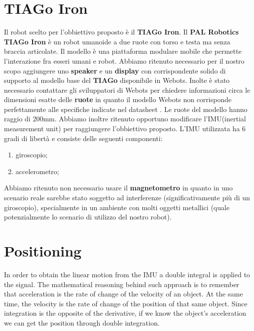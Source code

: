 \documentclass[a4paper]{article}
\begin{document}
	\section{TIAGo Iron} 
	Il robot scelto per l'obbiettivo proposto è il \textbf{TIAGo Iron}. \newline Il \textbf{PAL Robotics TIAGo Iron}\cite{tiagoiron} è un robot umanoide a due ruote con torso e testa ma senza braccia articolate. Il modello è una piattaforma modulare mobile che permette l'interazione fra esseri umani e robot. \newline
	Abbiamo ritenuto necessario per il nostro scopo aggiungere uno \textbf{speaker} e un \textbf{display} con corrispondente solido di supporto al modello base del \textbf{TIAGo} disponibile in Webots.
	Inolte è stato necessario contattare gli sviluppatori di Webots per chiedere informazioni circa le dimensioni esatte delle \textbf{ruote} in quanto il modello Webots non corrisponde perfettamente alle specifiche indicate nel datasheet \cite{Tiago IRON datasheet}. Le ruote del modello hanno raggio di 200mm. \newline
	\newline Abbiamo inoltre ritenuto opportuno modificare l'IMU(inertial measurement unit) per raggiungere l'obbiettivo proposto. L'IMU utilizzata ha 6 gradi di libertà e consiste delle seguenti componenti:
	\begin{enumerate}
		\item giroscopio;	
		\item accelerometro;
	\end{enumerate}
	Abbiamo ritenuto non necessario usare il \textbf{magnetometro} in quanto in uno scenario reale sarebbe stato soggetto ad interferenze (significativamente più di un giroscopio), specialmente in un ambiente con molti oggetti metallici (quale potenzialmente lo scenario di utilizzo del nostro robot).

	\section{Positioning}
	In order to obtain the linear motion from the IMU a double integral is applied to the signal. The mathematical reasoning behind such approach is to remember that acceleration is the rate of change of the velocity of an object. At the same time, the velocity is the rate of change of the position of that same object. Since integration is the opposite of the derivative, if we know the object's acceleration we can get the position through double integration.
	
\end{document}
